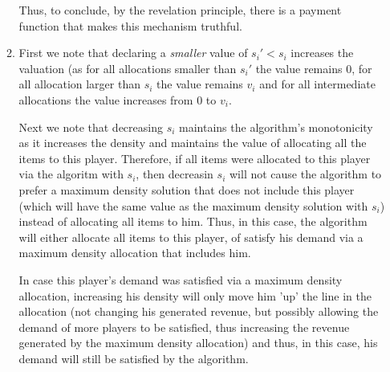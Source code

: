 \documentclass[a4page,notitlepage]{article}
\begin{document}
\begin{enumerate}
\begin{enumerate}
      Thus, to conclude, by the revelation principle, there is a payment function that makes this mechanism truthful.
      \item
        First we note that declaring a \emph{smaller} value of $s_i'<s_i$ increases the valuation (as for all allocations smaller than $s_i'$ the value remains 0, for all allocation larger than $s_i$ the value remains $v_i$ and for all intermediate allocations the value increases from 0 to $v_i$.

        Next we note that decreasing $s_i$ maintains the algorithm's monotonicity as it increases the density and maintains the value of allocating all the items to this player.
        Therefore, if all items were allocated to this player via the algoritm with $s_i$, then decreasin $s_i$ will not cause the algorithm to prefer a maximum density solution that does not include this player (which will have the same value as the maximum density solution with $s_i$) instead of allocating all items to him.
        Thus, in this case, the algorithm will either allocate all items to this player, of satisfy his demand via a maximum density allocation that includes him.

        In case this player's demand was satisfied via a maximum density allocation, increasing his density will only move him 'up' the line in the allocation (not changing his generated revenue, but possibly allowing the demand of more players to be satisfied, thus increasing the revenue generated by the maximum density allocation) and thus, in this case, his demand will still be satisfied by the algorithm.
        

\end{enumerate}
\end{enumerate}
\end{document}
